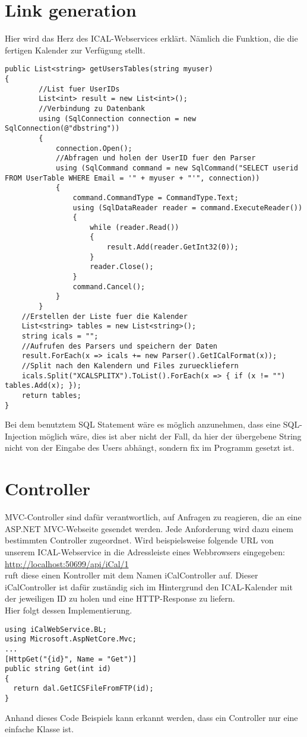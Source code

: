 {\section{Link generation}
\label{sec:link}
Hier wird das Herz des ICAL-Webservices erklärt. Nämlich die Funktion, die die fertigen Kalender zur Verfügung stellt.
\begin{lstlisting}
public List<string> getUsersTables(string myuser)
{
        //List fuer UserIDs
        List<int> result = new List<int>();
        //Verbindung zu Datenbank
        using (SqlConnection connection = new SqlConnection(@"dbstring"))
        {
            connection.Open();
            //Abfragen und holen der UserID fuer den Parser
            using (SqlCommand command = new SqlCommand("SELECT userid FROM UserTable WHERE Email = '" + myuser + "'", connection))
            {
                command.CommandType = CommandType.Text;
                using (SqlDataReader reader = command.ExecuteReader())
                {
                    while (reader.Read())
                    {
                        result.Add(reader.GetInt32(0));
                    }
                    reader.Close();
                }
                command.Cancel();
            }
        }
    //Erstellen der Liste fuer die Kalender
    List<string> tables = new List<string>();
    string icals = "";
    //Aufrufen des Parsers und speichern der Daten
    result.ForEach(x => icals += new Parser().GetICalFormat(x));
    //Split nach den Kalendern und Files zurueckliefern
    icals.Split("XCALSPLITX").ToList().ForEach(x => { if (x != "") tables.Add(x); });
    return tables;
}
\end{lstlisting}
Bei dem benutztem SQL Statement wäre es möglich anzunehmen, dass eine SQL-Injection möglich wäre, dies ist aber nicht der Fall, da hier der übergebene String nicht von der Eingabe des Users abhängt, sondern fix im Programm gesetzt ist.
\section{Controller}
\label{sec:Controller}
MVC-Controller sind dafür verantwortlich, auf Anfragen zu reagieren, die an eine ASP.NET MVC-Webseite gesendet werden. Jede Anforderung wird dazu einem bestimmten Controller zugeordnet. Wird beispielsweise folgende URL von unserem ICAL-Webservice in die Adressleiste eines Webbrowsers eingegeben:\\
\url{http://localhost:50699/api/iCal/1} \\
ruft diese einen Kontroller mit dem Namen iCalController auf. Dieser iCalController ist dafür zuständig sich im Hintergrund den ICAL-Kalender mit der jeweiligen ID zu holen und eine HTTP-Response zu liefern.\\ Hier folgt dessen Implementierung. 
\begin{lstlisting}
using iCalWebService.BL;
using Microsoft.AspNetCore.Mvc;
...
[HttpGet("{id}", Name = "Get")]
public string Get(int id)
{
  return dal.GetICSFileFromFTP(id);
}
\end{lstlisting}
Anhand dieses Code Beispiels kann erkannt werden, dass ein Controller nur eine einfache Klasse ist. 
}

